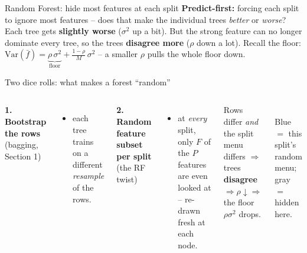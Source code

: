 \documentclass[aspectratio=169]{beamer}
\begin{document}
\begin{frame}{Random Forest: hide most features at each split}
  \vfill
  \textbf{Predict-first:} forcing each split to ignore most features -- does that make the
  individual trees \emph{better} or \emph{worse}?
  \pause
  \vfill
  Each tree gets \textbf{slightly worse} ($\sigma^2$ up a bit). But the strong feature can
  no longer dominate every tree, so the trees \textbf{disagree more} ($\rho$ down a lot).
  \vskip 3pt
  Recall the floor:
  $\mathrm{Var}(\bar f) = \underbrace{\rho\,\sigma^2}_{\text{floor}} + \frac{1-\rho}{M}\,\sigma^2$
  -- a smaller $\rho$ pulls the whole floor down.
  \vfill
\end{frame}

\begin{frame}{Two dice rolls: what makes a forest ``random''}
  \begin{columns}[T]
    \textbf{1. Bootstrap the rows} (bagging, Section 1)
    \begin{itemize}\small
      \item each tree trains on a different \emph{resample} of the rows.
    \end{itemize}
    \vskip 3pt
    \textbf{2. Random feature subset per split} (the RF twist)
    \begin{itemize}\small
      \item at \emph{every} split, only $F$ of the $P$ features are even looked at --
        re-drawn fresh at each node.
    \end{itemize}
    \vskip 5pt
    Rows differ \emph{and} the split menu differs $\Rightarrow$ trees \textbf{disagree}
    $\Rightarrow \rho\downarrow \Rightarrow$ the floor $\rho\sigma^2$ drops.
    \begin{center}
      \\[4pt]
      \scriptsize Blue $=$ this split's random menu; gray $=$ hidden here.
    \end{center}
  \end{columns}
\end{frame}
\end{document}
